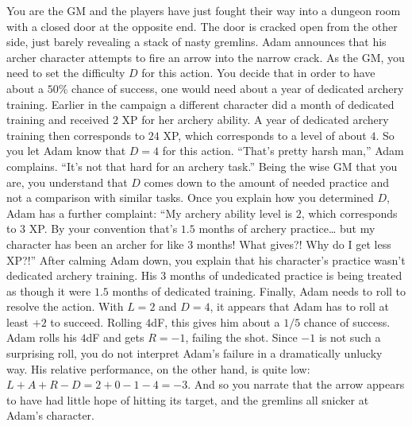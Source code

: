 \begin{example}
You are the GM and the players have just fought their way into a dungeon room with a closed door at the opposite end.
The door is cracked open from the other side, just barely revealing a stack of nasty gremlins.
Adam announces that his archer character attempts to fire an arrow into the narrow crack.
As the GM, you need to set the difficulty $D$ for this action.
You decide that in order to have about a $50\%$ chance of success, one would need about a year of dedicated archery training.
Earlier in the campaign a different character did a month of dedicated training and received $2$ XP for her archery ability.
A year of dedicated archery training then corresponds to $24$ XP, which corresponds to a level of about $4$.
So you let Adam know that $D=4$ for this action.
``That’s pretty harsh man,'' Adam complains.
``It’s not that hard for an archery task.''
Being the wise GM that you are, you understand that $D$ comes down to the amount of needed practice and not a comparison with similar tasks.
Once you explain how you determined $D$, Adam has a further complaint:
``My archery ability level is $2$, which corresponds to $3$ XP.
By your convention that’s $1.5$ months of archery practice… but my character has been an archer for like $3$ months!
What gives?!
Why do I get less XP?!'' After calming Adam down, you explain that his character’s practice wasn’t dedicated archery training.
His $3$ months of undedicated practice is being treated as though it were $1.5$ months of dedicated training.
Finally, Adam needs to roll to resolve the action.
With $L=2$ and $D=4$, it appears that Adam has to roll at least $+2$ to succeed.
Rolling $4$dF, this gives him about a $1/5$ chance of success.
Adam rolls his $4$dF and gets $R=-1$, failing the shot.
Since $-1$ is not such a surprising roll, you do not interpret Adam’s failure in a dramatically unlucky way.
His relative performance, on the other hand, is quite low: $L+A+R-D = 2+0-1-4 = -3$.
And so you narrate that the arrow appears to have had little hope of hitting its target,
and the gremlins all snicker at Adam’s character.
\end{example}


